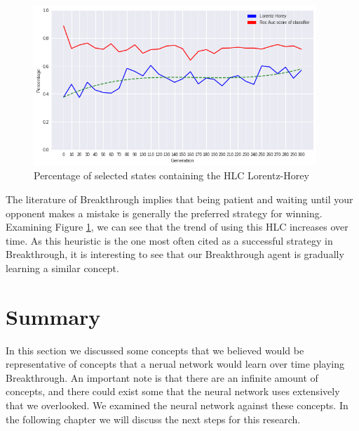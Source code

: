 \begin{figure}
    \begin{small}
        \begin{center}
            \includegraphics[width=0.95\textwidth]{graphics/lorentz_horey_trend.png}
        \end{center}
        \caption{Percentage of selected states containing the HLC Lorentz-Horey}
        \label{fig:lorentzheuristic}
    \end{small}
\end{figure}

The literature of Breakthrough implies that being patient and waiting until your opponent makes a mistake is generally the preferred strategy for winning.\cite{lorentz:heuristic} Examining Figure \ref{fig:lorentzheuristic}, we can see that the trend of using this HLC increases over time. As this heuristic is the one most often cited as a successful strategy in Breakthrough, it is interesting to see that our Breakthrough agent is gradually learning a similar concept.

\section{Summary}

In this section we discussed some concepts that we believed would be representative of concepts that a nerual network would learn over time playing Breakthrough. An important note is that there are an infinite amount of concepts, and there could exist some that the neural network uses extensively that we overlooked. We examined the neural network against these concepts. In the following chapter we will discuss the next steps for this research.